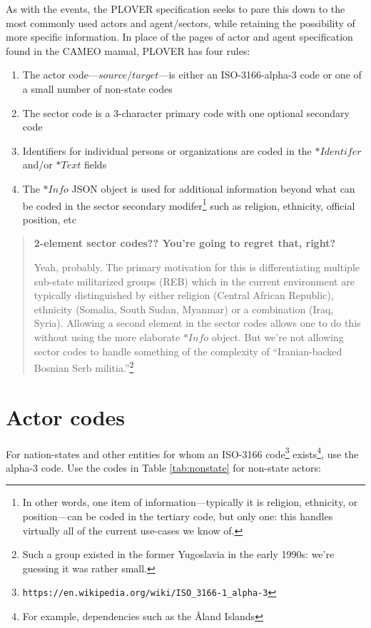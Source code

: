 \documentclass[11pt]{report}
\newcommand{\txt}[1]{\texttt{#1}}
\newcommand{\fn}[1]{\footnote{#1}}
\begin{document}
As with the events, the PLOVER specification seeks to pare this down to the most commonly used actors and agent/sectors, while retaining the possibility of more specific information. In place of the pages of actor and agent specification found in the CAMEO manual, PLOVER has four rules:

\begin{enumerate}
\item The actor code---$source/target$---is either an ISO-3166-alpha-3 code or one of a small number of non-state codes
\item The sector code is a 3-character primary code with one optional secondary code
\item Identifiers for individual persons or organizations are coded in the $*Identifer$ and/or $*Text$ fields
\item The $*Info$ JSON object is used for additional information beyond what can be coded in the sector secondary modifer\fn{In other words, one item of information---typically it is religion, ethnicity, or position---can be coded in the tertiary code, but only one: this handles virtually all of the current use-cases we know of.} such as religion, ethnicity, official position, etc
\end{enumerate}

\begin{quote}
\textbf{2-element sector codes?? You're going  to regret that, right?}

Yeah, probably. The primary motivation for this is differentiating multiple sub-state militarized groups (REB) which in the current environment are typically distinguished by either religion (Central African Republic), ethnicity (Somalia, South Sudan, Myanmar) or a combination (Iraq, Syria). Allowing a second element in the sector codes allows one to do this without using the more elaborate $*Info$ object. But we're not allowing sector codes to handle something of the complexity of ``Iranian-backed Bosnian Serb militia.''\fn{Such a group existed in the former Yugoslavia in the early 1990s: we're guessing it was rather small.}
\end{quote}

\section{Actor codes}

For nation-states and other entities for whom an ISO-3166 code\fn{\txt{https://en.wikipedia.org/wiki/ISO\_3166-1\_alpha-3}} exists\fn{For example, dependencies such as the \AA land Islands}, use the alpha-3 code. Use the codes in Table \ref{tab:nonstate} for non-state actors:
\end{document}
